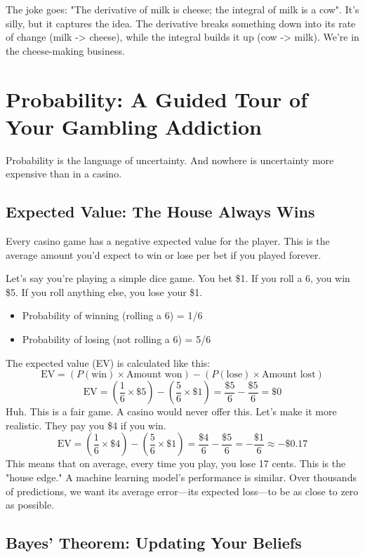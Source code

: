 \documentclass[11pt, letterpaper, openany]{book}
\begin{document}
The joke goes: "The derivative of milk is cheese; the integral of milk is a cow". It's silly, but it captures the idea. The derivative breaks something down into its rate of change (milk -> cheese), while the integral builds it up (cow -> milk). We're in the cheese-making business.

\section{Probability: A Guided Tour of Your Gambling Addiction}

Probability is the language of uncertainty. And nowhere is uncertainty more expensive than in a casino.

\subsection{Expected Value: The House Always Wins}

Every casino game has a negative expected value for the player. This is the average amount you'd expect to win or lose per bet if you played forever.

Let's say you're playing a simple dice game. You bet \$1. If you roll a 6, you win \$5. If you roll anything else, you lose your \$1.
\begin{itemize}
    \item Probability of winning (rolling a 6) = 1/6
    \item Probability of losing (not rolling a 6) = 5/6
\end{itemize}
The expected value (EV) is calculated like this:
\[ \text{EV} = (P(\text{win}) \times \text{Amount won}) - (P(\text{lose}) \times \text{Amount lost}) \]
\[ \text{EV} = \left(\frac{1}{6} \times \$5\right) - \left(\frac{5}{6} \times \$1\right) = \frac{\$5}{6} - \frac{\$5}{6} = \$0 \]
Huh. This is a fair game. A casino would never offer this. Let's make it more realistic. They pay you \$4 if you win.
\[ \text{EV} = \left(\frac{1}{6} \times \$4\right) - \left(\frac{5}{6} \times \$1\right) = \frac{\$4}{6} - \frac{\$5}{6} = -\frac{\$1}{6} \approx -\$0.17 \]
This means that on average, every time you play, you lose 17 cents. This is the "house edge." A machine learning model's performance is similar. Over thousands of predictions, we want its average error—its expected loss—to be as close to zero as possible.

\subsection{Bayes' Theorem: Updating Your Beliefs}
\end{document}
